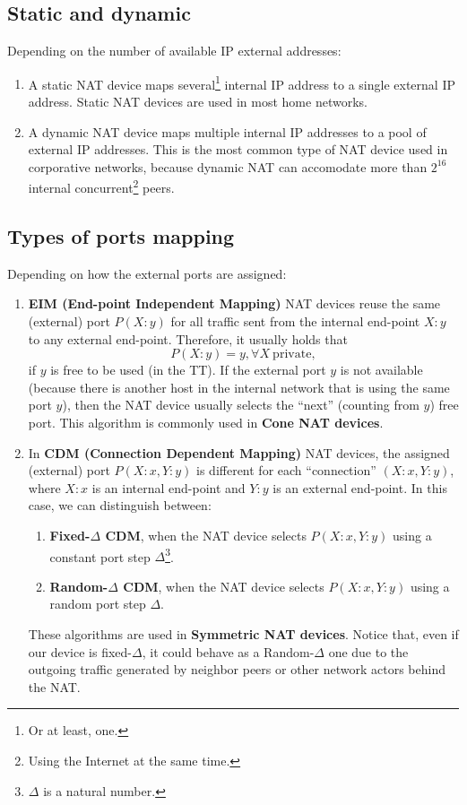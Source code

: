 \subsection{Static and dynamic}

Depending on the number of available IP external addresses:

\begin{enumerate}
\item A static NAT device maps several\footnote{Or at least, one.}
  internal IP address to a single external IP address. Static NAT
  devices are used in most home networks.
\item A dynamic NAT device maps multiple internal IP addresses to a
  pool of external IP addresses. This is the most common type of NAT
  device used in corporative networks, because dynamic NAT can
  accomodate more than $2^{16}$ internal concurrent\footnote{Using the
  Internet at the same time.} peers.
\end{enumerate}

\subsection{Types of ports mapping}

Depending on how the external ports are assigned:

\begin{enumerate}
\item \textbf{EIM (End-point Independent Mapping)} NAT devices reuse the same
  (external) port $P(X:y)$ for all traffic sent from the internal
  end-point $X:y$ to any external end-point. Therefore, it usually
  holds that
  \begin{equation}
    P(X:y)=y, \forall X~\mathrm{private},
  \end{equation}
  if $y$ is free to be used (in the TT). If the external port $y$ is not
  available (because there is another host in the internal network
  that is using the same port $y$), then the NAT device usually
  selects the ``next'' (counting from $y$) free port. This algorithm
  is commonly used in \textbf{Cone NAT devices}.
\item In \textbf{CDM (Connection Dependent Mapping)} NAT devices, the assigned
  (external) port $P(X:x,Y:y)$ is different for each ``connection''
  $(X:x,Y:y)$, where $X:x$ is an internal end-point and $Y:y$ is an
  external end-point. In this case, we can distinguish between:
  \begin{enumerate}
  \item \textbf{Fixed-$\Delta$ CDM}, when the NAT device selects $P(X:x,Y:y)$
    using a constant port step $\Delta$\footnote{$\Delta$ is a natural
      number.}.
  \item \textbf{Random-$\Delta$ CDM}, when the NAT device selects $P(X:x,Y:y)$
    using a random port step $\Delta$.
  \end{enumerate}
  These algorithms are used in \textbf{Symmetric NAT devices}. Notice
  that, even if our device is fixed-$\Delta$, it could behave as a
  Random-$\Delta$ one due to the outgoing traffic generated by
  neighbor peers or other network actors behind the NAT.
\end{enumerate}

